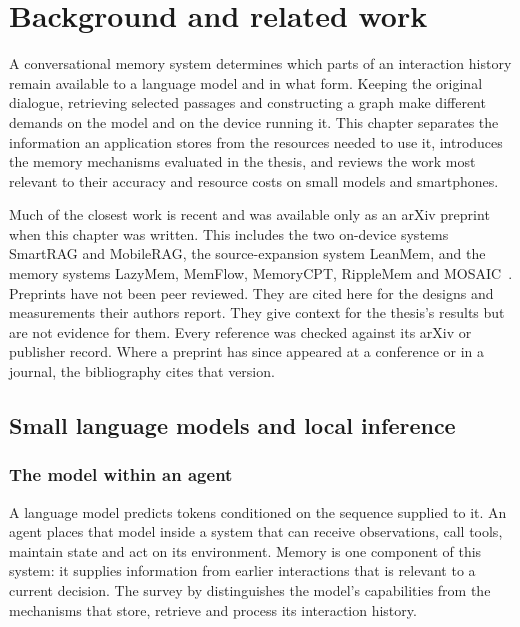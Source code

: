 
\chapter{Background and related work}
\label{ch:background}

A conversational memory system determines which parts of an interaction history remain
available to a language model and in what form. Keeping the original dialogue, retrieving
selected passages and constructing a graph make different demands on the model and on the
device running it. This chapter separates the information an application stores from the
resources needed to use it, introduces the memory mechanisms evaluated in the thesis, and
reviews the work most relevant to their accuracy and resource costs on small models and
smartphones.

Much of the closest work is recent and was available only as an arXiv preprint when this chapter
was written. This includes the two on-device systems SmartRAG and MobileRAG, the source-expansion
system LeanMem, and the memory systems LazyMem, MemFlow, MemoryCPT, RippleMem and
MOSAIC~\citep{smartrag,mobilerag_energy,leanmem,lazymem,memflow,memorycpt,ripplemem,mosaic}.
Preprints have not been peer reviewed. They are cited here for the designs and measurements their
authors report. They give context for the thesis's results but are not evidence for them. Every reference
was checked against its arXiv or publisher record. Where a preprint has since
appeared at a conference or in a journal, the bibliography cites that version.

\section{Small language models and local inference}
\label{sec:ch2_slms}

\subsection{The model within an agent}

A language model predicts tokens conditioned on the sequence supplied to it. An agent
places that model inside a system that can receive observations, call tools, maintain
state and act on its environment. Memory is one component of this system: it supplies
information from earlier interactions that is relevant to a current decision. The survey
by \citet{memory_survey2024} distinguishes the model's capabilities from the mechanisms
that store, retrieve and process its interaction history.

